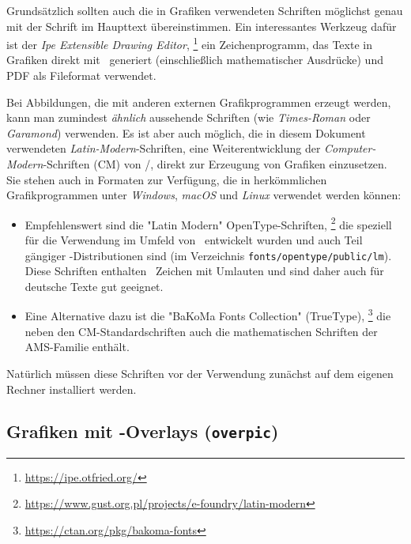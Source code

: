 Grundsätzlich sollten auch die in Grafiken verwendeten Schriften möglichst genau
mit der Schrift im Haupttext übereinstimmen. Ein interessantes Werkzeug dafür
ist der \emph{Ipe Extensible Drawing Editor},%
\footnote{\url{https://ipe.otfried.org/}}
ein Zeichenprogramm, das Texte in Grafiken direkt mit \latex\ generiert
(einschließlich mathematischer Ausdrücke) und PDF als Fileformat verwendet.

Bei Abbildungen, die mit anderen externen Grafikprogrammen erzeugt werden, kann
man zumindest \emph{ähnlich} aussehende Schriften (wie \emph{Times-Roman} oder
\emph{Garamond}) verwenden. Es ist aber auch möglich, die in diesem Dokument
verwendeten \emph{Latin-Modern}-Schriften, eine Weiterentwicklung der
\emph{Computer-Modern}-Schriften (CM) von {\tex}/{\latex}, direkt zur Erzeugung
von Grafiken einzusetzen. Sie stehen auch in Formaten zur Verfügung, die in
herkömmlichen Grafikprogrammen unter \emph{Windows}, \emph{macOS} und
\emph{Linux} verwendet werden können:
%
\begin{itemize}
\item	%
Empfehlenswert sind die "Latin Modern" OpenType-Schriften,%
\footnote{\url{https://www.gust.org.pl/projects/e-foundry/latin-modern}}
die speziell für die Verwendung im Umfeld von \latex\ entwickelt wurden und
auch Teil gängiger \latex-Distributionen sind (\zB im Verzeichnis
\nolinkurl{fonts/opentype/public/lm}). Diese Schriften enthalten \ua\ Zeichen
mit Umlauten und sind daher auch für deutsche Texte gut geeignet.
\item	%
Eine Alternative dazu ist die "BaKoMa Fonts Collection" (TrueType),%
\footnote{\url{https://ctan.org/pkg/bakoma-fonts}}
die neben den CM-Standardschriften auch die mathematischen Schriften der
AMS-Familie ent\-hält.
\end{itemize}
%
Natürlich müssen diese Schriften vor der Verwendung zunächst auf dem eigenen
Rechner installiert werden.

\subsection{Grafiken mit \latex-Overlays (\texttt{overpic})}
\label{sec:GraphicOverlays}

